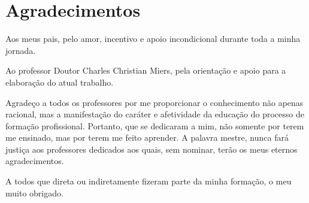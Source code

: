 \section*{Agradecimentos}


Aos meus pais, pelo amor, incentivo e apoio incondicional durante toda a minha jornada.



Ao professor Doutor Charles Christian Miers, pela orientação e apoio para a elaboração do atual trabalho.



Agradeço a todos os professores por me proporcionar o conhecimento não apenas racional, mas a manifestação do caráter e afetividade da educação do processo de formação profissional.
%
Portanto, que se dedicaram a mim, não somente por terem me ensinado, mas por terem me feito aprender. 
%
A palavra mestre, nunca fará justiça aos professores dedicados aos quais, sem nominar, terão os meus eternos agradecimentos.



A todos que direta ou indiretamente fizeram parte da minha formação, o meu muito obrigado.